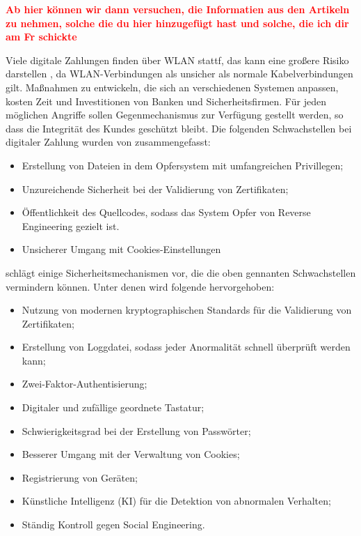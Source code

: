 \textbf{\textcolor{red}{Ab hier können wir dann versuchen, die Informatien aus den Artikeln zu nehmen, solche
die du hier hinzugefügt hast und solche, die ich dir am Fr schickte}}

Viele digitale Zahlungen finden über WLAN stattf, das kann eine großere Risiko darstellen \cite{refip:NYRS}, 
da WLAN-Verbindungen als unsicher als normale Kabelverbindungen gilt. Maßnahmen zu entwickeln, die sich an 
verschiedenen Systemen anpassen, kosten Zeit und Investitionen von Banken und Sicherheitsfirmen. Für jeden 
möglichen Angriffe sollen Gegenmechanismus zur Verfügung gestellt werden, so dass die Integrität des Kundes
geschützt bleibt. Die folgenden Schwachstellen bei digitaler Zahlung wurden von \cite{refip:NYRS} 
zusammengefasst:


\begin{itemize}
    \item Erstellung von Dateien in dem Opfersystem mit umfangreichen Privillegen;
    \item Unzureichende Sicherheit bei der Validierung von Zertifikaten;
    \item Öffentlichkeit des Quellcodes, sodass das System Opfer von Reverse Engineering gezielt ist.
    \item Unsicherer Umgang mit Cookies-Einstellungen
\end{itemize}

\cite{refip:NYRS} schlägt einige Sicherheitsmechanismen vor, die die oben gennanten Schwachstellen vermindern
können. Unter denen wird folgende hervorgehoben: 

\begin{itemize}
    \item Nutzung von modernen kryptographischen Standards für die Validierung von Zertifikaten;
    \item Erstellung von Loggdatei, sodass jeder Anormalität schnell überprüft werden kann;
    \item Zwei-Faktor-Authentisierung;
    \item Digitaler und zufällige geordnete Tastatur;
    \item Schwierigkeitsgrad bei der Erstellung von Passwörter;
    \item Besserer Umgang mit der Verwaltung von Cookies;
    \item Registrierung von Geräten;
    \item Künstliche Intelligenz (KI) für die Detektion von abnormalen Verhalten;
    \item Ständig Kontroll gegen Social Engineering.
\end{itemize}




